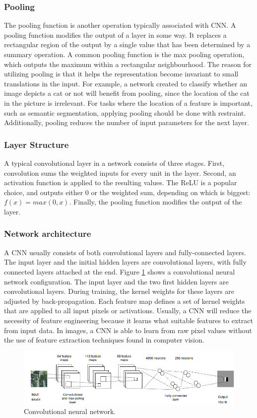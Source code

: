 \subsubsection{Pooling}
The pooling function is another operation typically associated with \ac{CNN}. A pooling function modifies the output of a layer in some way. It replaces a rectangular region of the output by a single value that has been determined by a summary operation. A common pooling function is the max pooling operation, which outputs the maximum within a rectangular neighbourhood. The reason for utilizing pooling is that it helps the representation become invariant to small translations in the input. For example, a network created to classify whether an image depicts a cat or not will benefit from pooling, since the location of the cat in the picture is irrelevant. For tasks where the location of a feature is important, such as semantic segmentation, applying pooling should be done with restraint. Additionally, pooling reduces the number of input parameters for the next layer.

\subsubsection{Layer Structure}
A typical convolutional layer in a network consists of three stages. First, convolution sums the weighted inputs for every unit in the layer. Second, an activation function is applied to the resulting values. The \ac{ReLU} is a popular choice, and outputs either 0 or the weighted sum, depending on which is biggest: $f(x) = max(0, x)$. Finally, the pooling function modifies the output of the layer. 

\subsubsection{Network architecture}
A \ac{CNN} usually consists of both convolutional layers and fully-connected layers. The input layer and the initial hidden layers are convolutional layers, with fully connected layers attached at the end. Figure \ref{fig:conv} shows a convolutional neural network configuration. The input layer and the two first hidden layers are convolutional layers. During training, the kernel weights for these layers are adjusted by back-propagation. Each feature map defines a set of kernel weights that are applied to all input pixels or activations. Usually, a \ac{CNN} will reduce the necessity of feature engineering because it learns what suitable features to extract from input data. In images, a \ac{CNN} is able to learn from raw pixel values without the use of feature extraction techniques found in computer vision.


\begin{figure}[t]
\begin{center}
\includegraphics[width=1\columnwidth]{figs/conv_diagram.png}
\caption[Convolutional neural network]{Convolutional neural network. }
\label{fig:conv}
\end{center}
\end{figure}
